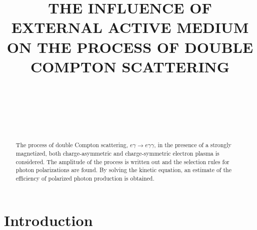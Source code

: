 \documentclass[
aps,%
12pt,%
final,%
notitlepage,%
oneside,%
onecolumn,%
nobibnotes,%
nofootinbib,%
superscriptaddress,%
noshowpacs,%
centertags]%
{revtex4}
\begin{document}

\title{THE INFLUENCE OF EXTERNAL ACTIVE MEDIUM ON THE PROCESS OF DOUBLE COMPTON SCATTERING
}%

\author{~}
%

\author{~}
%

\author{~}
%





\begin{abstract}
The process of double Compton scattering, $e \gamma \to e \gamma \gamma$, in the presence of
a strongly magnetized, both charge-asymmetric and charge-symmetric electron plasma is considered. 
The amplitude of the process is written out and
the selection rules for photon polarizations are found.
By solving the kinetic equation, an estimate of the efficiency of polarized photon production is obtained.
\end{abstract}


\maketitle


\section{Introduction}
\end{document}
